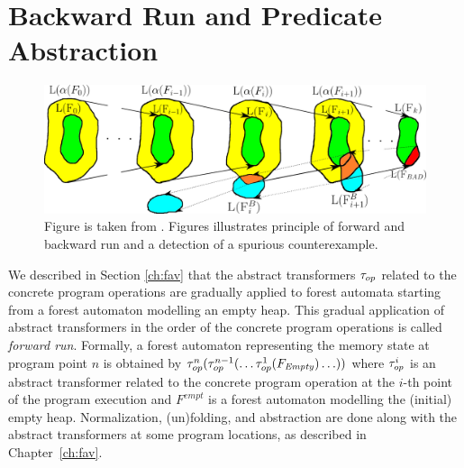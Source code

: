 \section{Backward Run and Predicate Abstraction}
\label{sec:br}

\begin{figure}[t]
	\centering
	\includegraphics[scale=0.33]{fig/artmc.png}
	\caption{
		Figure is taken from \cite{artmc}.
		Figures illustrates principle of forward and backward run and
		a detection of a spurious counterexample.}
	\label{fig:bwrun}
\end{figure}

We described in Section \ref{ch:fav} that the abstract transformers $\tau_{op}$
related to the concrete program operations are gradually applied to forest automata
starting from a forest automaton modelling an empty heap.
This gradual application of abstract transformers in the order of
the concrete program operations is called \emph{forward run}.
Formally, a forest automaton representing the memory state 
at program point $n$ is obtained by
$\tau_{op}^n(\tau_{op}^{n-1}(\ldots \tau_{op}^{1}(F_\mathit{Empty}) \ldots))$
where $\tau_{op}^i$ is an abstract transformer related to the concrete
program operation at the $i$-th point of the program execution and
$F^{empt}$ is a forest automaton modelling the (initial) empty heap.
Normalization, (un)folding, and abstraction are done
along with the abstract transformers at some program locations,
as described in Chapter~\ref{ch:fav}.

